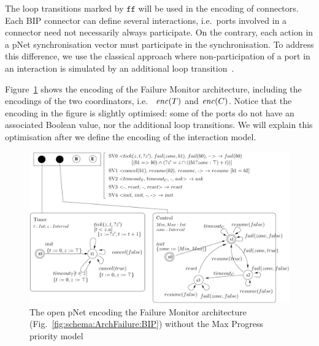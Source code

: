 \documentclass{llncs}
\newcommand{\Simon}{\\\hfill\mdash Simon}
\newcommand{\noteSBin}[2][inline,color=green!40]{\todo[#1]{{#2}\Simon}}
\newcommand{\fig}[1]{Fig.~\ref{fig:#1}}
\newcommand{\Fig}[1]{Figure~\ref{fig:#1}}
\newcommand{\mdash}[1][]{---#1}
\newcommand{\ie}[1][\ ]{i.e.#1}
\newcommand{\eg}[1][\ ]{e.g.#1}
\newcommand{\false}{\ensuremath{\mathtt{f\!f}}}
\newcommand{\nopri}[1][]{\ensuremath{\mathit{enc}%
    \ifx#1\relax\else(#1)\fi}}
\begin{document}
The loop transitions marked by $\false$ will be used in the encoding
of connectors.  Each BIP connector can define several interactions,
\ie ports involved in a connector need not necessarily always
participate.  On the contrary, each action in a pNet synchronisation
vector must participate in the synchronisation.  To address this
difference, we use the classical approach
where non-participation of a port in an interaction is simulated
by an additional loop transition~\cite{milner83-calculi}.

\Fig{FailureTimer:pNet} shows the encoding of the Failure Monitor
architecture, including the encodings of the two coordinators, \ie
$\nopri[\NameTimer]$ and $\nopri[\NameCtrl]$.  Notice that the
encoding in the figure is slightly optimised: some of the ports do not
have an associated Boolean value, nor the additional loop transitions.
We will explain this optimisation after we define the
encoding of the interaction model.

\begin{figure}[t]
  \centering
  \includegraphics[width=0.9\columnwidth]{FailureTimerPNET-v4}
  \caption{The open pNet encoding the Failure Monitor architecture (\fig{schema:ArchFailure:BIP}) without the Max Progress priority model}
  \label{fig:FailureTimer:pNet}
%
\end{figure}

\end{document}
